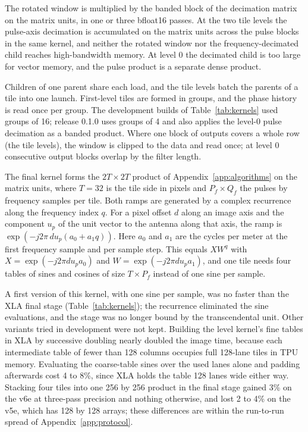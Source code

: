\documentclass[11pt]{article}
\begin{document}
The rotated window is multiplied by the banded block of the decimation matrix on the matrix units, in one or three bfloat16 passes. At the two tile levels the pulse-axis decimation is accumulated on the matrix units across the pulse blocks in the same kernel, and neither the rotated window nor the frequency-decimated child reaches high-bandwidth memory. At level 0 the decimated child is too large for vector memory, and the pulse product is a separate dense product.

Children of one parent share each load, and the tile levels batch the parents of a tile into one launch. First-level tiles are formed in groups, and the phase history is read once per group. The development builds of Table~\ref{tab:kernels} used groups of 16; release 0.1.0 uses groups of 4 and also applies the level-0 pulse decimation as a banded product. Where one block of outputs covers a whole row (the tile levels), the window is clipped to the data and read once; at level 0 consecutive output blocks overlap by the filter length.

The final kernel forms the $2T \times 2T$ product of Appendix~\ref{app:algorithms} on the matrix units, where $T = 32$ is the tile side in pixels and $P_f \times Q_f$ the pulses by frequency samples per tile. Both ramps are generated by a complex recurrence along the frequency index $q$. For a pixel offset $d$ along an image axis and the component $u_p$ of the unit vector to the antenna along that axis, the ramp is $\exp(-j 2\pi\, d u_p (a_0 + a_1 q))$. Here $a_0$ and $a_1$ are the cycles per meter at the first frequency sample and per sample step. This equals $X W^q$ with $X = \exp(-j 2\pi d u_p a_0)$ and $W = \exp(-j 2\pi d u_p a_1)$, and one tile needs four tables of sines and cosines of size $T \times P_f$ instead of one sine per sample. 

A first version of this kernel, with one sine per sample, was no faster than the XLA final stage (Table~\ref{tab:kernels}); the recurrence eliminated the sine evaluations, and the stage was no longer bound by the transcendental unit. Other variants tried in development were not kept. Building the level kernel's fine tables in XLA by successive doubling nearly doubled the image time, because each intermediate table of fewer than 128 columns occupies full 128-lane tiles in TPU memory. Evaluating the coarse-table sines over the used lanes alone and padding afterwards cost 4 to 8\%, since XLA holds the table 128 lanes wide either way. Stacking four tiles into one 256 by 256 product in the final stage gained 3\% on the v6e at three-pass precision and nothing otherwise, and lost 2 to 4\% on the v5e, which has 128 by 128 arrays; these differences are within the run-to-run spread of Appendix~\ref{app:protocol}.
\end{document}
